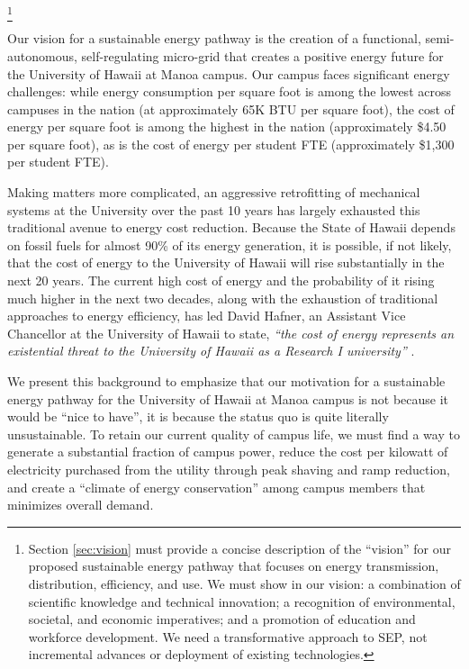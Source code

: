 \footnote{Section \ref{sec:vision} must provide a concise description of the ``vision'' for our
  proposed sustainable energy pathway that focuses on energy transmission,
  distribution, efficiency, and use.
  We must show in our vision: a combination of scientific knowledge and
  technical innovation; a recognition of environmental, societal, and
  economic imperatives; and a promotion of education and workforce
  development.
  We need a transformative approach to SEP, not incremental advances or
  deployment of existing technologies. }

Our vision for a sustainable energy pathway is the creation of a
functional, semi-autonomous, self-regulating micro-grid that creates a
positive energy future for the University of Hawaii at Manoa campus. Our
campus faces significant energy challenges: while energy
consumption per square foot is among the lowest across campuses in the
nation (at approximately 65K BTU per square foot), the cost of energy per
square foot is among the highest in the nation (approximately \$4.50 per
square foot), as is the cost of energy per student FTE (approximately
\$1,300 per student FTE).  

Making matters more complicated, an aggressive retrofitting of mechanical
systems at the University over the past 10 years has largely exhausted this
traditional avenue to energy cost reduction.  Because the State of Hawaii
depends on fossil fuels for almost 90\% of its energy generation, it is
possible, if not likely, that the cost of energy to the University of
Hawaii will rise substantially in the next 20 years. The current high cost
of energy and the probability of it rising much higher in the next two
decades, along with the exhaustion of traditional approaches to energy
efficiency, has led David Hafner, an Assistant Vice Chancellor at the
University of Hawaii to state, {\em ``the cost of energy represents an
  existential threat to the University of Hawaii as a Research I
  university''} \cite{Hafner2011}.

We present this background to emphasize that our motivation for a
sustainable energy pathway for the University of Hawaii at Manoa campus is
not because it would be ``nice to have'', it is because the status quo is
quite literally unsustainable.  To retain our current quality of campus
life, we must find a way to generate a substantial fraction of campus
power, reduce the cost per kilowatt of electricity purchased from the
utility through peak shaving and ramp reduction, and create a ``climate of
energy conservation'' among campus members that minimizes overall demand. 

